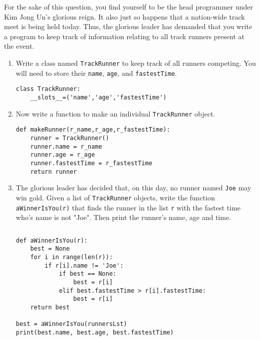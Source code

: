 For the sake of this question, you find yourself to be the head programmer under Kim Jong Un's glorious reign.
It also just so happens that a nation-wide track meet is being held today. Thus, the glorious leader has demanded that
you write a program to keep track of information relating to all track runners present at the event.

\begin{enumerate}
\item Write a class named \texttt{TrackRunner} to keep track of all runners competing.
You will need to store their \texttt{name}, \texttt{age}, and \texttt{fastestTime}.
\begin{answer}
\begin{lstlisting}
class TrackRunner:
    __slots__=('name','age','fastestTime')

\end{lstlisting}
\end{answer}

\item Now write a function to make an individual \texttt{TrackRunner} object.
\begin{answer}
\begin{lstlisting}
def makeRunner(r_name,r_age,r_fastestTime):
    runner = TrackRunner()
    runner.name = r_name
    runner.age = r_age
    runner.fastestTime = r_fastestTime
    return runner
\end{lstlisting}
\end{answer}

\item The glorious leader has decided that, on this day, no runner named \texttt{Joe} may win
gold. Given a list of \texttt{TrackRunner} objects, write the function \texttt{aWinnerIsYou(r)} that finds the runner in the list \texttt{r} with the fastest time who's name is not "Joe". 
Then print the runner's name, age and time.
\begin{lstlisting}

\end{lstlisting}
\begin{answer}
\begin{lstlisting}
def aWinnerIsYou(r):
    best = None
    for i in range(len(r)):
        if r[i].name != 'Joe':
            if best == None:
                best = r[i]
            elif best.fastestTime > r[i].fastestTime:
                best = r[i]
    return best

best = aWinnerIsYou(runnersLst)
print(best.name, best.age, best.fastestTime)
\end{lstlisting}
\end{answer}
\end{enumerate}
